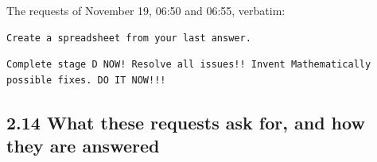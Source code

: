 \documentclass[
  10pt,
]{article}
\begin{document}
The requests of November 19, 06:50 and 06:55, verbatim:

\begin{verbatim}
Create a spreadsheet from your last answer.
\end{verbatim}

\begin{verbatim}
Complete stage D NOW! Resolve all issues!! Invent Mathematically possible fixes. DO IT NOW!!!
\end{verbatim}

\hypertarget{what-these-requests-ask-for-and-how-they-are-answered-3}{%
\subsection{2.14 What these requests ask for, and how they are
answered}\label{what-these-requests-ask-for-and-how-they-are-answered-3}}
\end{document}
